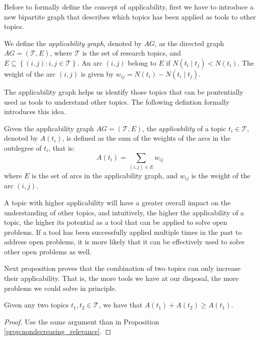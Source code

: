 Before to formally define the concept of applicability, first we have to introduce a new bipartite graph that describes which topics has been applied as tools to other topics.

\begin{definition}
\label{def:applicability-graph}
We define the \emph{applicability graph}, denoted by $AG$, as the directed graph $AG = (\mathcal{T}, E)$, where $\mathcal{T}$ is the set of research topics, and $E\subseteq\left\{ (i,j):i,j\in \mathcal{T} \right\} $. An arc $(i, j)$ belong to $E$ if $N \left( t_i \mid t_j \right) < N \left( t_i \right)$. The weight of the arc $(i, j)$ is given by $w_{ij} = N \left( t_i \right) - N \left( t_i \mid t_j \right)$.
\end{definition}

The applicability graph helps us identify those topics that can be pontentially used as tools to understand other topics. The following defintion formally introduces this idea.

\begin{definition}
\label{def:applicability}
Given the applicability graph $AG = (\mathcal{T}, E)$, the \emph{applicability} of a topic $t_i \in \mathcal{T}$, denoted by $A(t_i)$, is defined as the sum of the weights of the arcs in the outdegree of $t_i$, that is:
\[
A(t_i) = \sum_{(i, j) \in E} w_{ij}
\]
where $E$ is the set of arcs in the applicability graph, and $w_{ij}$ is the weight of the arc $(i, j)$.
\end{definition}

A topic with higher applicability will have a greater overall impact on the understanding of other topics, and intuitively, the higher the applicability of a topic, the higher its potential as a tool that can be applied to solve open problems. If a tool has been successfully applied multiple times in the past to address open problems, it is more likely that it can be effectively used to solve other open problems as well.

Next proposition proves that the combination of two topics can only increase their applicability. That is, the more tools we have at our disposal, the more problems we could solve in principle.

\begin{proposition}
Given any two topics $t_1, t_2 \in \mathcal{T}$, we have that $A(t_1) + A(t_2) \geq A(t_1)$.
\end{proposition}
\begin{proof}
Use the same argument than in Proposition \ref{prop:nondecreasing_relevance}.
\end{proof}


